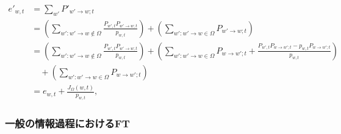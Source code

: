 \documentclass[a4paper,11pt]{jsarticle}
\numberwithin{equation}{section}
\begin{document}
\begin{align}
    e'_{w,t} &= \sum_{w'} P'_{w' \to w; t} \nonumber \\
    &= \left( \sum_{w': w' \to w \notin \Omega} \frac{P_{w', t} P_{w' \to w; t}}{p_{w, t}} \right) 
    + \left( \sum_{w': w' \to w \in \Omega} P_{w' \to w; t} \right) \nonumber \\
    &= \left( \sum_{w': w' \to w \notin \Omega} \frac{P_{w', t} P_{w' \to w; t}}{p_{w, t}} \right) 
    + \left( \sum_{w': w' \to w \in \Omega} P_{w \to w'; t} + \frac{P_{w', t} P_{w \to w'; t} - p_{w, t} P_{w \to w'; t}}{p_{w, t}} \right) \nonumber \\
    & \quad + \left( \sum_{w': w' \to w \in \Omega} P_{w \to w'; t} \right) \nonumber \\
    &= e_{w, t} + \frac{J_\Omega(w, t)}{p_{w, t}}, \tag{9.63}
\end{align}
\subsubsection{一般の情報過程におけるFT}
\end{document}
